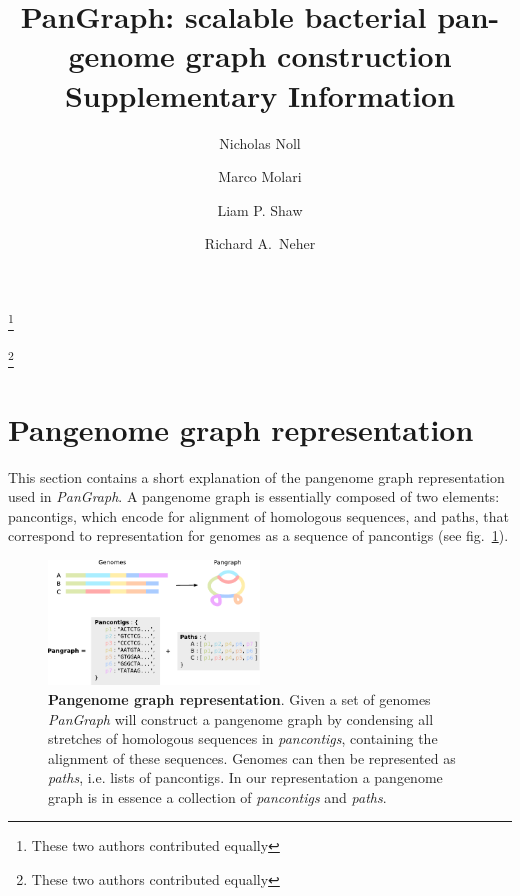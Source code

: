 \documentclass[aps,rmp,reprint,superscriptaddress,notitlepage,10pt,onecolumn]{revtex4-1}
\begin{document}
\title{PanGraph: scalable bacterial pan-genome graph construction \\ Supplementary Information}
\author{Nicholas Noll}
\thanks{These two authors contributed equally}
\author{Marco Molari}
\thanks{These two authors contributed equally}
\author{Liam P. Shaw}
\author{Richard A.~Neher}

\maketitle

\section{Pangenome graph representation}
\label{sec:graph-repr}

This section contains a short explanation of the pangenome graph representation used in \textit{PanGraph}. A pangenome graph is essentially composed of two elements: pancontigs, which encode for alignment of homologous sequences, and paths, that correspond to representation for genomes as a sequence of pancontigs (see fig.~\ref{fig:graph-representation}).\\

\begin{figure}[htb]
    \includegraphics[width=0.5\textwidth]{figs_suppl/graph_representation.pdf}
    \caption{{\bf Pangenome graph representation}. Given a set of genomes \textit{PanGraph} will construct a pangenome graph by condensing all stretches of homologous sequences in \textit{pancontigs}, containing the alignment of these sequences. Genomes can then be represented as \textit{paths}, i.e. lists of pancontigs.
        In our representation a pangenome graph is in essence a collection of \textit{pancontigs} and \textit{paths}.
    }
    \label{fig:graph-representation}
\end{figure}
\end{document}
